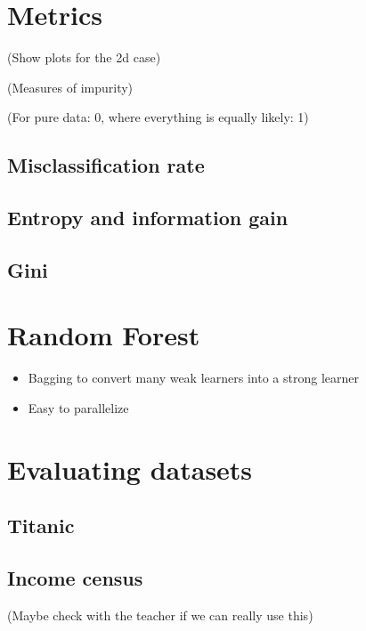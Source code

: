 \documentclass[a4paper]{article}
\begin{document}
\section{Metrics}

(Show plots for the 2d case)

(Measures of impurity)

(For pure data: 0, where everything is equally likely: 1)

\subsection{Misclassification rate}

\subsection{Entropy and information gain}

\subsection{Gini}

\section{Random Forest}

\begin{itemize}
	\item Bagging to convert many weak learners into a strong learner
    \item Easy to parallelize
\end{itemize}

\section{Evaluating datasets}

\subsection{Titanic}

\subsection{Income census}

(Maybe check with the teacher if we can really use this)



\end{document}
